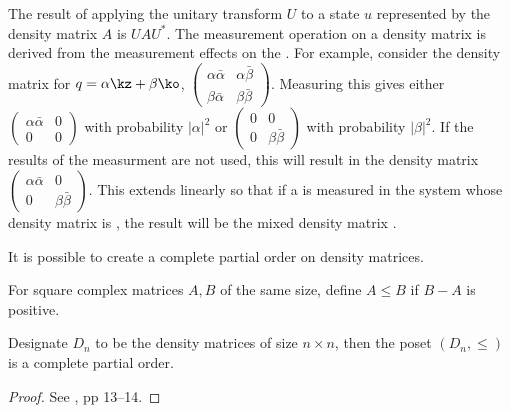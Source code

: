 The result of applying the unitary transform $U$ to a state $u$ represented by the density matrix
$A$ is $UAU^{*}$. The measurement operation on a density matrix is derived from the measurement
effects on the \qubit. For example, consider the density matrix for $q=\alpha\kz+\beta\ko$,
$\begin{pmatrix}\alpha\bar{\alpha}&\alpha\bar{\beta}\\ \beta\bar{\alpha} &
\beta\bar{\beta}\end{pmatrix}$. Measuring this \qubit gives either
$\begin{pmatrix}\alpha\bar{\alpha}&0\\ 0& 0\end{pmatrix}$ with probability $|\alpha|^{2}$ or
$\begin{pmatrix}0&0\\ 0 & \beta\bar{\beta}\end{pmatrix}$ with probability $|\beta|^{2}$. If the
results of the measurment are not used, this will result in the density matrix
$\begin{pmatrix}\alpha\bar{\alpha}&0\\ 0 & \beta\bar{\beta}\end{pmatrix}$. This extends linearly so
that if a \qubit is measured in the system whose density matrix is , the result
will be the mixed density matrix .

It is possible to create a complete partial order on density matrices.

\begin{definition}\label{def:lownerorder}
  For square complex matrices $A,B$ of the same size, define $A \le B$ if $B-A$ is positive.
\end{definition}

\begin{lemma} \label{lemma:cpodensity}
  Designate $D_{n}$ to be the density matrices of size $n\times n$, then the poset $(D_{n}, \le)$
  is a complete partial order.
\end{lemma}
\begin{proof}
  See \cite{selinger04:qpl}, pp 13--14.
\end{proof}



